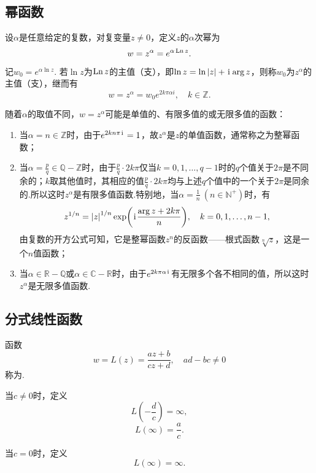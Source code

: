 \subsection{幂函数}
\begin{definition}
设\(\alpha\)是任意给定的复数，对复变量\(z \neq 0\)，定义\(z\)的\(\alpha\)次幂为\[
w = z^{\alpha} = e^{\alpha \operatorname{Ln} z}.
\]

记\(w_0 = e^{\alpha \ln z}\).
若\(\ln z\)为\(\operatorname{Ln} z\)的主值（支），即\(\ln z = \ln\abs{z} + \kern1pt\mathrm{i}\kern1pt \arg z\)，则称\(w_0\)为\(z^{\alpha}\)的主值（支），继而有\[
w = z^{\alpha} = w_0 e^{2k\pi\alpha i}, \quad k\in\mathbb{Z}.
\]
\end{definition}

\begin{property}
随着\(\alpha\)的取值不同，\(w=z^{\alpha}\)可能是单值的、有限多值的或无限多值的函数：
\begin{enumerate}
\item 当\(\alpha=n\in\mathbb{Z}\)时，由于\(e^{2 k n \pi \kern1pt\mathrm{i}\kern1pt}=1\)，故\(z^{\alpha}\)是\(z\)的单值函数，通常称之为整幂函数；
\item 当\(\alpha=\frac{p}{q}\in\mathbb{Q}-\mathbb{Z}\)时，由于\(\frac{p}{q} \cdot 2 k \pi\)仅当\(k=0,1,\dots,q-1\)时的\(q\)个值关于\(2\pi\)是不同余的；\(k\)取其他值时，其相应的值\(\frac{p}{q} \cdot 2 k \pi\)均与上述\(q\)个值中的一个关于\(2\pi\)是同余的.所以这时\(z^{\alpha}\)是有限多值函数.特别地，当\(\alpha=\frac{1}{n}\ (n\in\mathbb{N}^+)\)时，有\[
z^{1/n} = \abs{z}^{1/n} \exp(\kern1pt\mathrm{i}\kern1pt\frac{\arg z + 2 k \pi}{n}), \quad k=0,1,\dotsc,n-1,
\]由复数的开方公式可知，它是整幂函数\(z^n\)的反函数——根式函数\(\sqrt[n]{z}\)，这是一个\(n\)值函数；
\item 当\(\alpha\in\mathbb{R}-\mathbb{Q}\)或\(\alpha\in\mathbb{C}-\mathbb{R}\)时，由于\(e^{2 k \pi \alpha \kern1pt\mathrm{i}\kern1pt}\)有无限多个各不相同的值，所以这时\(z^{\alpha}\)是无限多值函数.
\end{enumerate}
\end{property}

\subsection{分式线性函数}
\begin{definition}
函数\[
w = L(z) = \frac{a z + b}{c z + d}, \quad ad-bc \neq 0
\]称为.

当\(c \neq 0\)时，定义\[
L\left(-\frac{d}{c}\right) = \infty,
\]\[
L(\infty) = \frac{a}{c}.
\]

当\(c = 0\)时，定义\[
L(\infty) = \infty.
\]
\end{definition}
